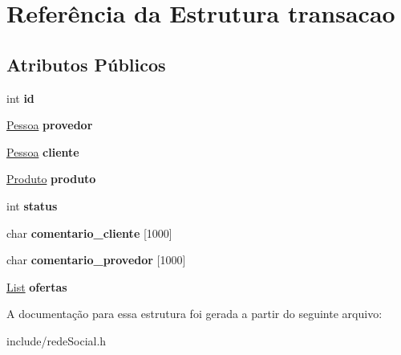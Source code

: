 \hypertarget{structtransacao}{}\section{Referência da Estrutura transacao}
\label{structtransacao}
\subsection*{Atributos Públicos}
\begin{DoxyCompactItemize}
\item 
\mbox{\label{structtransacao_aa4136876fb27948aedaf0dfb35e6b4ec}} 
int {\bfseries id}
\item 
\mbox{\label{structtransacao_ae8932bd1de3dd41906f357310aa1a3b4}} 
\hyperlink{structpessoa}{Pessoa} {\bfseries provedor}
\item 
\mbox{\label{structtransacao_a35f236c864743a8224cdcc4ef08875bf}} 
\hyperlink{structpessoa}{Pessoa} {\bfseries cliente}
\item 
\mbox{\label{structtransacao_a711d494042bf522088f3f25fc7299a21}} 
\hyperlink{structproduto}{Produto} {\bfseries produto}
\item 
\mbox{\label{structtransacao_ad1859124a1c74c98a285e73e2ef53ba5}} 
int {\bfseries status}
\item 
\mbox{\label{structtransacao_a1d863f578f35716ea5e7fade6814fc42}} 
char {\bfseries comentario\+\_\+cliente} \mbox{[}1000\mbox{]}
\item 
\mbox{\label{structtransacao_a7a0227cacf8430fe32e55048e35ca302}} 
char {\bfseries comentario\+\_\+provedor} \mbox{[}1000\mbox{]}
\item 
\mbox{\label{structtransacao_acbb11d435f016382611f086217b740ad}} 
\hyperlink{structlistNode}{List} {\bfseries ofertas}
\end{DoxyCompactItemize}


A documentação para essa estrutura foi gerada a partir do seguinte arquivo\+:\begin{DoxyCompactItemize}
\item 
include/rede\+Social.\+h\end{DoxyCompactItemize}

